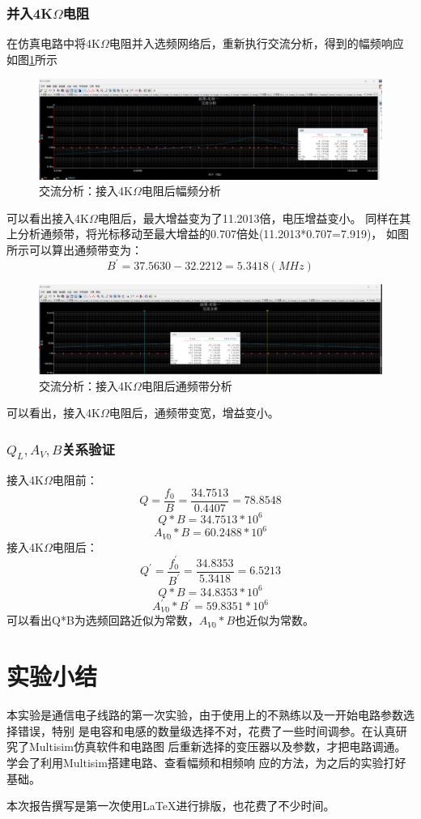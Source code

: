 \documentclass[UTF8]{ctexart}
\begin{document}
\subsubsection{并入4K$\Omega$电阻}
在仿真电路中将4K$\Omega$电阻并入选频网络后，重新执行交流分析，得到的幅频响应如图\ref{img:multisim_alternating_analyze_R}所示
\begin{figure}[htbp]
    \centering
    \includegraphics[width=0.8\linewidth]{multisim_alternating_analyze_R.png}
    \caption{交流分析：接入4K$\Omega$电阻后幅频分析}
    \label{img:multisim_alternating_analyze_R}
\end{figure}
可以看出接入4K$\Omega$电阻后，最大增益变为了11.2013倍，电压增益变小。
同样在其上分析通频带，将光标移动至最大增益的0.707倍处(11.2013*0.707=7.919)，
如图所示可以算出通频带变为：
$$
B^{'}=37.5630-32.2212=5.3418(MHz)
$$
\begin{figure}[htbp]
    \centering
    \includegraphics[width=0.8\linewidth]{multisim_alternating_analysis_R.png}
    \caption{交流分析：接入4K$\Omega$电阻后通频带分析}
    \label{img:multisim_alternating_analysis_R}
\end{figure}
可以看出，接入4K$\Omega$电阻后，通频带变宽，增益变小。
\subsubsection{$Q_L,A_V,B$关系验证}
接入4K$\Omega$电阻前：
$$
Q=\frac{f_0}{B}=\frac{34.7513}{0.4407}=78.8548
$$
$$
Q*B=34.7513*10^6
$$
$$
A_{V0}*B=60.2488*10^6
$$
接入4K$\Omega$电阻后：
$$
Q^{'}=\frac{f_0^{'}}{B^{'}}=\frac{34.8353}{5.3418}=6.5213
$$
$$
Q*B=34.8353*10^6
$$
$$
A_{V0}^{'}*B^{'}=59.8351*10^6
$$
可以看出Q*B为选频回路近似为常数，$A_{V0}*B$也近似为常数。
\section{实验小结}
本实验是通信电子线路的第一次实验，由于使用上的不熟练以及一开始电路参数选择错误，特别
是电容和电感的数量级选择不对，花费了一些时间调参。在认真研究了Multisim仿真软件和电路图
后重新选择的变压器以及参数，才把电路调通。学会了利用Multisim搭建电路、查看幅频和相频响
应的方法，为之后的实验打好基础。

本次报告撰写是第一次使用\LaTeX 进行排版，也花费了不少时间。
\end{document}
